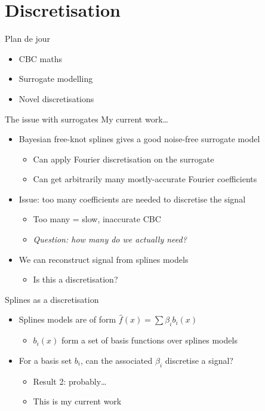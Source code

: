 \documentclass[presentation]{beamer}
\begin{document}
\section{Discretisation}
\label{sec:orgf5a35dd}
\begin{frame}[label={sec:org19637e9}]{Plan de jour}
\begin{itemize}
\item CBC maths
\item Surrogate modelling
\item \alert{Novel discretisations}
\end{itemize}
\end{frame}
\begin{frame}[<+->][label={sec:orgb7b6318}]{The issue with surrogates}
My current work\ldots{}
\begin{itemize}
\item Bayesian free-knot splines gives a good noise-free surrogate model
\begin{itemize}
\item Can apply Fourier discretisation on the surrogate
\item Can get arbitrarily many mostly-accurate Fourier coefficients
\end{itemize}
\item Issue: too many coefficients are needed to discretise the signal
\begin{itemize}
\item Too many = slow, inaccurate CBC
\item \emph{Question: how many do we actually need?}
\end{itemize}
\item We can reconstruct signal from splines models
\begin{itemize}
\item Is this a discretisation?
\end{itemize}
\end{itemize}
\end{frame}

\begin{frame}[<+->][label={sec:org3f0c9d7}]{Splines as a discretisation}
\begin{itemize}
\item Splines models are of form \(\hat{f}(x) = \sum \beta_i b_i(x)\)
\begin{itemize}
\item \(b_i(x)\) form a set of basis functions over splines models
\end{itemize}
\item For a basis set \(b_i\), can the associated \(\beta_i\) discretise a signal?
\begin{itemize}
\item Result 2: probably\ldots{}
\item This is my current work
\end{itemize}
\end{itemize}
\end{frame}
\end{document}
